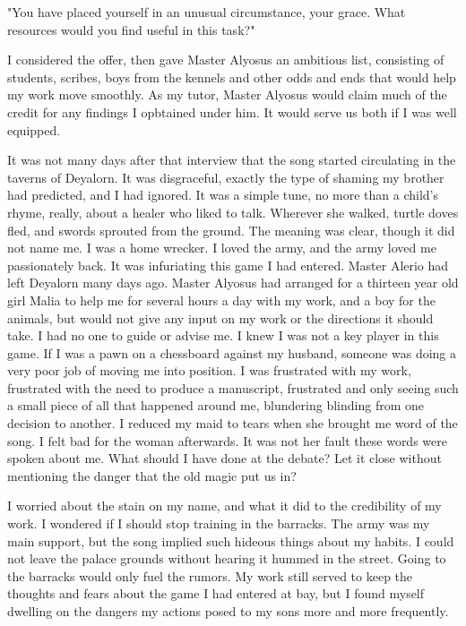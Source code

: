 \documentclass{article}
\begin{document}
"You have placed yourself in an unusual circumstance, your grace. What resources would you find useful in this task?"

I considered the offer, then gave Master Alyosus an ambitious list, consisting of students, scribes, boys from the kennels and other odds and ends that would help my work move smoothly. As my tutor, Master Alyosus would claim much of the credit for any findings I opbtained under him. It would serve us both if I was well equipped.

\vspace{.5cm}

It was not many days after that interview that the song started circulating in the taverns of Deyalorn. It was disgraceful, exactly the type of shaming my brother had predicted, and I had ignored. It was a simple tune, no more than a child's rhyme, really, about a healer who liked to talk. Wherever she walked, turtle doves fled, and swords sprouted from the ground. The meaning was clear, though it did not name me. I was a home wrecker. I loved the army, and the army loved me passionately back. It was infuriating this game I had entered. Master Alerio had left Deyalorn many days ago. Master Alyosus had arranged for a thirteen year old girl Malia to help me for several hours a day with my work, and a boy for the animals, but would not give any input on my work or the directions it should take. I had no one to guide or advise me. I knew I was not a key player in this game. If I was a pawn on a chessboard against my husband, someone was doing a very poor job of moving me into position. I was frustrated with my work, frustrated with the need to produce a manuscript, frustrated and only seeing such a small piece of all that happened around me, blundering blinding from one decision to another. I reduced my maid to tears when she brought me word of the song. I felt bad for the woman afterwards. It was not her fault these words were spoken about me. What should I have done at the debate? Let it close without mentioning the danger that the old magic put us in?

I worried about the stain on my name, and what it did to the credibility of my work. I wondered if I should stop training in the barracks. The army was my main support, but the song implied such hideous things about my habits. I could not leave the palace grounds without hearing it hummed in the street. Going to the barracks would only fuel the rumors. My work still served to keep the thoughts and fears about the game I had entered at bay, but I found myself dwelling on the dangers my actions posed to my sons more and more frequently. 
\end{document}
